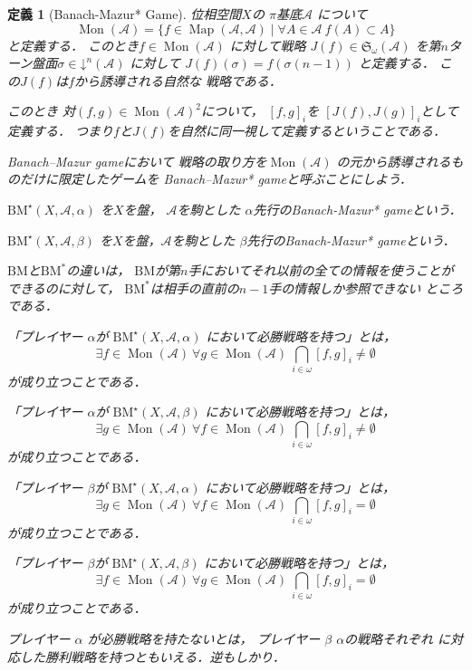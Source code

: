 \documentclass[leqno, 12pt]{jsarticle}
\newtheorem{df}[thm]{定義}
\DeclareMathOperator{\map}{Map}
\DeclareMathOperator{\mon}{Mon}
\newcommand{\mycal}[1]{\mathcal{#1}}
\newcommand{\mydn}[2]{\mathord{\downarrow}^{#1}(#2)}
\newcommand{\mysen}[2]{\mathfrak{S}_{#1}(#2)}
\newcommand{\myka}[3]{[#1, #2]_{#3}}
\newcommand{\mybmb}[3]{\mathrm{BM}^{\star}(#1, #2, #3)}
\newcommand{\myom}{\omega}
\begin{document}
\begin{df}[Banach-Mazur* Game]
位相空間$X$の
$\pi$基底$\mycal{A}$
について
\[
\mon(\mycal{A})=
\{f\in \map(\mycal{A}, \mycal{A})\mid 
\forall A\in \mycal{A}\ f(A)\subset A\}
\]
と定義する．
このとき$f\in \mon(\mycal{A})$
に対して戦略
$J(f)\in \mysen{\myom}{\mycal{A}}$
を第$n$ターン盤面$\sigma\in \mydn{n}{\mycal{A}}$
に対して
$J(f)(\sigma)=f(\sigma(n-1))$
と定義する．
この$J(f)$は$f$から誘導される自然な
戦略である．

このとき
対$(f, g)\in \mon(\mathcal{A})^{2}$について，
$\myka{f}{g}{i}$を
$\myka{J(f)}{J(g)}{i}$として定義する．
つまり$f$と$J(f)$を自然に同一視して定義するということである．

Banach--Mazur gameにおいて
戦略の取り方を$\mon(\mycal{A})$
の元から誘導されるものだけに限定したゲームを
Banach--Mazur* gameと呼ぶことにしよう．

$\mybmb{X}{\mycal{A}}{\alpha}$
を$X$を盤，
$\mathcal{A}$を駒とした
$\alpha$先行のBanach-Mazur* gameという．

$\mybmb{X}{\mycal{A}}{\beta}$
を$X$を盤，$\mathcal{A}$を駒とした
$\beta$先行のBanach-Mazur* gameという．

$\mathrm{BM}$と$\mathrm{BM^{*}}$の違いは，
$\mathrm{BM}$が第$n$手においてそれ以前の全ての情報を使うことができるのに対して，
$\mathrm{BM^{*}}$は相手の直前の$n-1$手の情報しか参照できない
ところである．


「プレイヤー
$\alpha$が
$\mybmb{X}{\mycal{A}}{\alpha}$
において必勝戦略を持つ」とは，
\[
\exists f\in  \mon(\mycal{A})\ \forall g\in  \mon(\mycal{A})\ 
\bigcap_{i\in \myom}
\myka{f}{g}{i}\neq 
\emptyset
\]
が成り立つことである．

「プレイヤー
$\alpha$が
$\mybmb{X}{\mycal{A}}{\beta}$
において必勝戦略を持つ」とは，
\[
\exists g\in  \mon(\mycal{A})\ \forall f\in  \mon(\mycal{A})\ 
\bigcap_{i\in \myom}
\myka{f}{g}{i}\neq
\emptyset
\]
が成り立つことである．

「プレイヤー
$\beta$が
$\mybmb{X}{\mycal{A}}{\alpha}$
において必勝戦略を持つ」とは，
\[
\exists g\in  \mon(\mycal{A})\ \forall f\in  \mon(\mycal{A})\ 
\bigcap_{i\in \myom}
\myka{f}{g}{i}=
\emptyset
\]
が成り立つことである．

「プレイヤー
$\beta$が
$\mybmb{X}{\mycal{A}}{\beta}$
において必勝戦略を持つ」とは，
\[
\exists f\in  \mon(\mycal{A})\ \forall g\in  \mon(\mycal{A})\ 
\bigcap_{i\in \myom}
\myka{f}{g}{i}
=\emptyset
\]
が成り立つことである．

プレイヤー
$\alpha$
が必勝戦略を持たないとは，
プレイヤー
$\beta$
$\alpha$の戦略それぞれ
に対応した勝利戦略を持つともいえる．逆もしかり．
\end{df}
\end{document}
